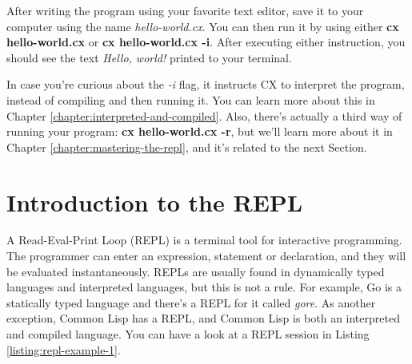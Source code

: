 \documentclass[11pt,fleqn,openany]{book} %
\begin{document}
After writing the program using your favorite text editor, save it to your computer using the name \emph{hello-world.cx}. You can then run it by using either \textbf{cx hello-world.cx} or \textbf{cx hello-world.cx -i}. After executing either instruction, you should see the text \textit{Hello, world!} printed to your terminal.

In case you're curious about the \emph{-i} flag, it instructs CX to interpret the program, instead of compiling and then running it. You can learn more about this in Chapter \ref{chapter:interpreted-and-compiled}. Also, there's actually a third way of running your program: \textbf{cx hello-world.cx -r}, but we'll learn more about it in Chapter \ref{chapter:mastering-the-repl}, and it's related to the next Section.

\section{Introduction to the REPL}
\label{section:introduction-to-the-repl}


A Read-Eval-Print Loop (REPL) is a terminal tool for interactive programming. The programmer can enter an expression, statement or declaration, and they will be evaluated instantaneously. REPLs are usually found in dynamically typed languages and interpreted languages, but this is not a rule. For example, Go is a statically typed language and there's a REPL for it called \emph{gore}. As another exception, Common Lisp has a REPL, and Common Lisp is both an interpreted and compiled language. You can have a look at a REPL session in Listing \ref{listing:repl-example-1}.
\end{document}
